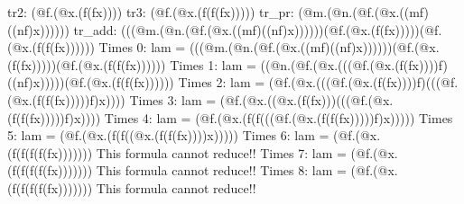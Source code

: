 \documentclass[a4paper,11pt]{jsarticle}
\begin{document}
\title{}
\author{}
\date{\today}
\maketitle



tr2: (@f.(@x.(f(fx))))
tr3: (@f.(@x.(f(f(fx)))))
tr_pr: (@m.(@n.(@f.(@x.((mf)((nf)x))))))
tr_add: (((@m.(@n.(@f.(@x.((mf)((nf)x))))))(@f.(@x.(f(fx)))))(@f.(@x.(f(f(fx))))))
Times 0: lam = (((@m.(@n.(@f.(@x.((mf)((nf)x))))))(@f.(@x.(f(fx)))))(@f.(@x.(f(f(fx))))))
Times 1: lam = ((@n.(@f.(@x.(((@f.(@x.(f(fx))))f)((nf)x)))))(@f.(@x.(f(f(fx))))))
Times 2: lam = (@f.(@x.(((@f.(@x.(f(fx))))f)(((@f.(@x.(f(f(fx)))))f)x))))
Times 3: lam = (@f.(@x.((@x.(f(fx)))(((@f.(@x.(f(f(fx)))))f)x))))
Times 4: lam = (@f.(@x.(f(f(((@f.(@x.(f(f(fx)))))f)x)))))
Times 5: lam = (@f.(@x.(f(f((@x.(f(f(fx))))x)))))
Times 6: lam = (@f.(@x.(f(f(f(f(fx)))))))
This formula cannot reduce!! 
Times 7: lam = (@f.(@x.(f(f(f(f(fx)))))))
This formula cannot reduce!! 
Times 8: lam = (@f.(@x.(f(f(f(f(fx)))))))
This formula cannot reduce!! 
\end{document}
